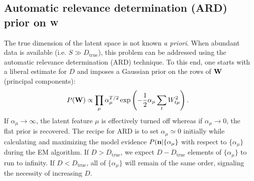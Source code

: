 \documentclass[nofootinbib,amssymb,amsmath]{revtex4}
\newcommand{\vn}{{\bf n}}
\newcommand{\vW}{{\bf W}}
\begin{document}
\subsection{Automatic relevance determination (ARD) prior on $\vW$}
The true dimension of the latent space is not known {\em a priori}. When abundant data is available (i.e. $S \gg D_\mathrm{true}$), this problem can be addressed using the automatic relevance determination (ARD) technique. To this end, one starts with a liberal estimate for $D$ and imposes a Gaussian prior on the rows of $\vW$ (principal components):
\begin{equation}
P(\vW) \propto \prod_\mu \alpha_\mu^{T/2} \exp \left( -\frac{1}{2} \alpha_\mu \sum_t W_{t\mu}^2  \right).
\label{eq:ARD_prior}
\end{equation}
If $\alpha_\mu \rightarrow \infty$, the latent feature $\mu$ is effectively turned off whereas if $\alpha_\mu \rightarrow 0$, the flat prior is recovered. The recipe for ARD is to set $\alpha_\mu \simeq 0$ initially while calculating and maximizing the model evidence $P(\vn | \{\alpha_\mu\}$ with respect to $\{\alpha_\mu\}$ during the EM algorithm. If $D > D_\mathrm{true}$, we expect $D - D_\mathrm{true}$ elements of $\{\alpha_\mu\}$ to run to infinity. If $D < D_\mathrm{true}$, all of $\{\alpha_\mu\}$ will remain of the same order, signaling the necessity of increasing $D$.
\end{document}
